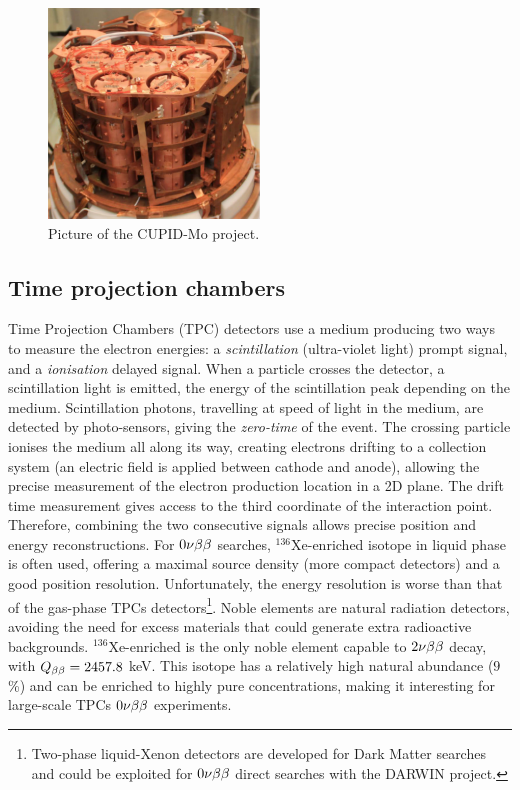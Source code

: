 \begin{figure}
  \centering
  \includegraphics[width=0.5\textwidth]{neutrinophysics/fig_neutrinophysics/CUPID-Mo.pdf}
  \caption{Picture of the CUPID-Mo project.
    \label{fig:CUPID-Mo}}
\end{figure}

\subsection{Time projection chambers}
\label{subsec:TPC}

Time Projection Chambers (TPC) detectors use a medium producing two ways to measure the electron energies: a \emph{scintillation} (ultra-violet light) prompt signal, and a \emph{ionisation} delayed signal.
When a particle crosses the detector, a scintillation light is emitted, the energy of the scintillation peak depending on the medium.
Scintillation photons, travelling at speed of light in the medium, are detected by photo-sensors, giving the \emph{zero-time} of the event.
The crossing particle ionises the medium all along its way, creating electrons drifting to a collection system (an electric field is applied between cathode and anode), allowing the precise measurement of the electron production location in a 2D plane.
The drift time measurement gives access to the third coordinate of the interaction point.
Therefore, combining the two consecutive signals allows precise position and energy reconstructions.
For $0\nu\beta\beta$ searches, $^{136}$Xe-enriched isotope in liquid phase is often used, offering a maximal source density (more compact detectors) and a good position resolution.
Unfortunately, the energy resolution is worse than that of the gas-phase TPCs detectors\footnote{Two-phase liquid-Xenon detectors are developed for Dark Matter searches and could be exploited for $0\nu\beta\beta$ direct searches with the DARWIN project.}.
Noble elements are natural radiation detectors, avoiding the need for excess materials that could generate extra radioactive backgrounds.
$^{136}$Xe-enriched is the only noble element capable to $2\nu\beta\beta$ decay, with $Q_{\beta\beta}=2457.8$ keV.
This isotope has a relatively high natural abundance ($9$\%) and can be enriched to highly pure concentrations, making it interesting for large-scale TPCs $0\nu\beta\beta$ experiments.

